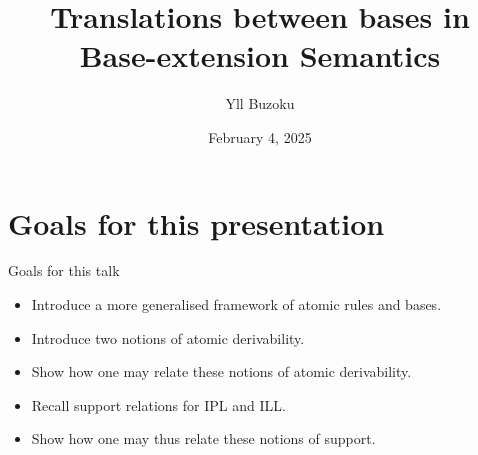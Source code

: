 \documentclass{beamer}
\title[Translations between bases in B-eS]{Translations between bases in Base-extension Semantics}
\author{Yll Buzoku}
\institute[UCL]{%
  Department of Computer Science \\ %
  University College London
}
\date{February 4, 2025}
\begin{document}
\begin{frame}
\titlepage
\end{frame}
\section*{Goals for this presentation}
\begin{frame}{Goals for this talk}
\begin{itemize}
\item Introduce a more generalised framework of atomic rules and bases.
\item Introduce two notions of atomic derivability.
\item Show how one may relate these notions of atomic derivability.
\item Recall support relations for IPL and ILL.
\item Show how one may thus relate these notions of support.
\end{itemize}
\end{frame}
\end{document}
